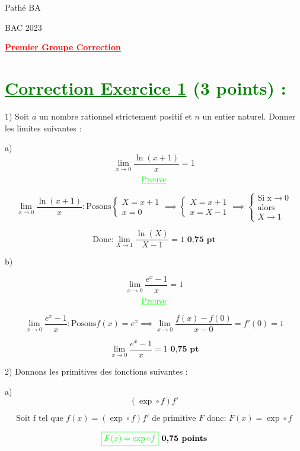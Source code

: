 \documentclass[12pt]{article}
\begin{document}
\begin{minipage}{0.8\textwidth}
	Pathé BA                          
\end{minipage}
\begin{minipage}{0.8\textwidth}
	BAC 2023
\end{minipage}

\begin{center}
\textbf{{\underline{\textcolor{red}{Premier Groupe Correction}}}}
\end{center}
\section*{\textcolor{green}{\underline{Correction Exercice 1} (3 points) :}}
1) Soit \(a\) un nombre rationnel strictement positif et \(n\) un entier naturel. Donner les limites suivantes :

a) 
\[ \lim_{x \to 0} \frac{\ln(x+1)}{x}=1 \]
\[ \textcolor{green}{\underline{\text{Preuve}}} \]

\[
\lim_{x \to 0} \frac{\ln(x+1)}{x}: \text{Posons}
\begin{cases}
X=x+1\\
x=0
\end{cases}\implies
\begin{cases}
X=x+1\\
x=X-1
\end{cases}\implies
\begin{cases}
\text{Si x}\rightarrow 0\\ \text{alors }\\ X\rightarrow 1
\end{cases}
\]

\[
 \text{Donc:}\lim_{X \to 1} \frac{\ln(X)}{X-1}=1 \textbf{ 0,75 pt}
\]

b)

\[
 \lim_{x \to 0} \frac{e^x - 1}{x}=1 
\]
\[ \textcolor{green}{\underline{\text{Preuve}}} \]

\[
\lim_{x \to 0} \frac{e^x - 1}{x}: \text{Posons}
f(x)=e^{x}\implies
\lim_{x \to 0} \frac{f(x) - f(0)}{x-0}=f'(0)=1
\]

\[
 \lim_{x \to 0} \frac{e^x - 1}{x}=1 \textbf{ 0,75 pt}
\]

2) Donnons les primitives des fonctions suivantes :

a)
\[
( \exp \circ f)f' 
\]

\[
\text{Soit f tel que }f(x)=( \exp \circ f)f' \text{ de primitive } F \text{ donc: } F(x)=\exp\circ f
\]

\[
\textcolor{green}{\boxed{ F(x)=\exp\circ f }} \textbf{ 0,75 points}
\]
\end{document}
